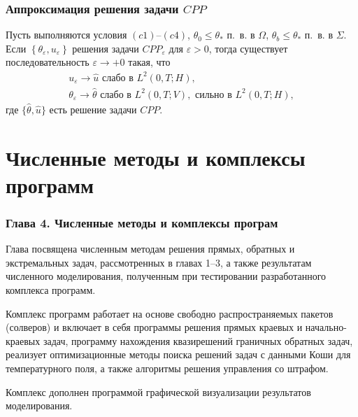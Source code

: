 \begin{frame}
    \frametitle{Аппроксимация решения задачи $CPP$}
    \begin{theorem}[3.6]
        Пусть выполняются условия $(c1)$--$(c4)$,
        $\theta_{0} \leq \theta_{*}$ п.\ в. в $\Omega$, $\theta_{b} \leq \theta_{*}$ п.\ в. в
        $\Sigma$.
        Если $\left\{\theta_{\varepsilon}, u_{\varepsilon}\right\}$ решения задачи
        $CPP_{\varepsilon}$ для $\varepsilon>0$, тогда существует последовательность
        $\varepsilon \rightarrow+0$ такая, что
        \[
            \begin{gathered}
                u_{\varepsilon} \rightarrow \widehat{u} \text{ слабо в } L^{2}(0, T ; H), \\
                \theta_{\varepsilon} \rightarrow \widehat{\theta}
                \text{ слабо в } L^{2}(0, T ; V),\text{ сильно в } L^{2}(0, T ; H),
            \end{gathered}
        \]
        где
        $\{\widehat{\theta}, \widehat{u}\}$ есть решение задачи $CPP$.
    \end{theorem}
\end{frame}


\section{Численные методы и комплексы программ}\label{sec:prog}
\begin{frame}
    \frametitle{Глава 4. Численные методы и комплексы програм}
    Глава посвящена численным методам решения прямых, обратных и экстремальных задач,
    рассмотренных в главах 1–3, а также результатам численного
    моделирования, полученным при тестировании разработанного комплекса программ.

    Комплекс программ работает на основе свободно распространяемых
    пакетов (солверов) и включает в себя программы решения прямых краевых
    и начально-краевых задач, программу нахождения квазирешений граничных
    обратных задач, реализует оптимизационные методы поиска решений задач с
    данными Коши для температурного поля, а также алгоритмы решения управления со штрафом.

    Комплекс дополнен программой графической визуализации результатов моделирования.
\end{frame}

